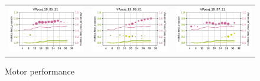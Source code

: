 \begin{figure}
\begin{tabular}{cc|c}
\includegraphics[width=\subplotwidth]{./figures/csp_spoc_incommon/bubble_csp_spoc_incommon_VPpcaj_d2_nolegend}& \includegraphics[width=\subplotwidth]{./figures/csp_spoc_incommon/bubble_csp_spoc_incommon_VPpcaj_d3_nolegend}& \includegraphics[width=\subplotwidth]{./figures/csp_spoc_incommon/bubble_csp_spoc_incommon_VPpcaj_d4_nolegend}\\
\end{tabular}
\caption{Motor performance}
\label{fig:decoding_performance_all}
\end{figure}